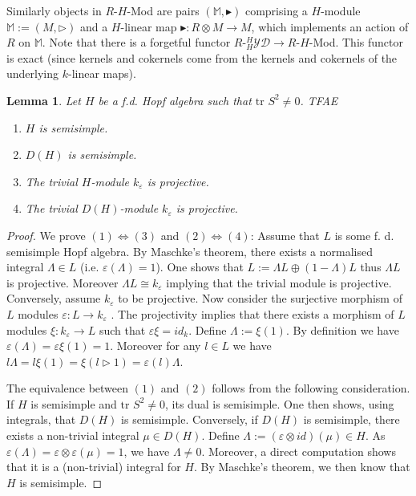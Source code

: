 \documentclass{amsart}
\newtheorem{lemma}{Lemma}
\theoremstyle{definition}
\newcommand{\YD}[1]{\ensuremath{{}^{#1}_{#1}\mathcal{YD}}}
\begin{document}
	Similarly objects in $R$-$H$-Mod are pairs $(\mathbb M,\blacktriangleright)$ comprising a $H$-module $\mathbb M := (M,\triangleright)$ and a $H$-linear map $\blacktriangleright: R \otimes M \rightarrow M$, which implements an action of $R$ on $\mathbb M$.
	Note that there is a forgetful functor $R$-$\YD H\rightarrow R$-$H$-Mod.
	This functor is exact (since kernels and cokernels come from the kernels and cokernels of the underlying $k$-linear maps). 
	
	
	\begin{lemma}
		Let $H$ be a f.d. Hopf algebra such that $\text{tr } S^2 \neq 0$. TFAE
		\begin{enumerate}
			\item $H$ is semisimple.
			\item $D(H)$ is semisimple.
			\item The trivial $H$-module $k_\varepsilon$ is projective.
			\item The trivial $D(H)$-module $k_\varepsilon$ is projective.
		\end{enumerate}
	\end{lemma}
	\begin{proof}
		We prove $(1) \Leftrightarrow (3)$ and $(2) \Leftrightarrow (4)$:
		Assume that $L$ is some f. d.  semisimple Hopf algebra. By Maschke's theorem, there exists a normalised integral $\Lambda \in L$ (i.e. $\varepsilon(\Lambda) =1$). 
		One shows that $L:= \Lambda L \oplus (1-\Lambda)L$ thus $\Lambda L$ is projective.  Moreover $\Lambda L\cong k_\varepsilon$ implying that the trivial module is projective.
		Conversely, assume $k_\varepsilon$ to be projective.
		Now consider the surjective morphism of $L$ modules $\varepsilon: L \rightarrow k_\varepsilon$ . The projectivity implies that there exists a morphism of $L$ modules $\xi: k_\varepsilon \rightarrow L$ such that $\varepsilon \xi = id_k$. Define $\Lambda:= \xi(1)$. By 
		definition we have $\varepsilon(\Lambda) = \varepsilon\xi (1)= 1$.
		Moreover for any $l\in L$ we have $l \Lambda = l \xi(1) = \xi (l\triangleright 1) = \varepsilon(l) \Lambda$. 
		
		The equivalence between $(1)$ and $(2)$ follows from the following consideration.
		If $H$ is semisimple and $\text{tr } S^2 \neq 0$, its dual is semisimple. One then shows, using integrals, that $D(H)$ is semisimple. Conversely, if $D(H)$ is semisimple, there exists a non-trivial integral $\mu \in D(H)$.  Define $\Lambda:= (\varepsilon \otimes id)(\mu) \in H$. As $\varepsilon(\Lambda)= \varepsilon\otimes \varepsilon (\mu)=1$, we have $\Lambda \neq 0$. Moreover, a direct computation shows that it is a (non-trivial) integral for $H$. By Maschke's theorem, we then know that $H$ is semisimple.
		
	\end{proof}
	
\end{document}
